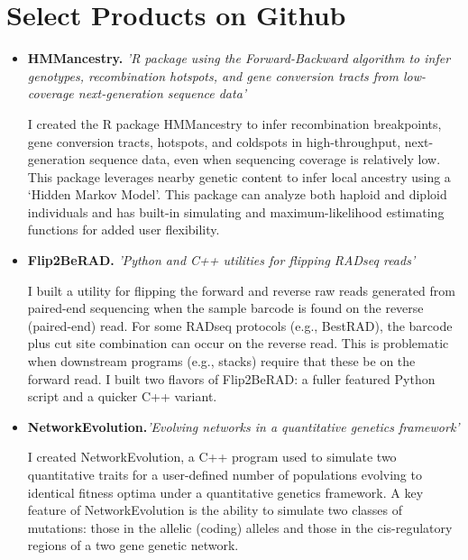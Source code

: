 \documentclass[11pt,letterpaper,sans]{moderncv}        %
\begin{document}
\section{Select Products on Github}


\begin{itemize}

\item{\textbf{HMMancestry.} \textit{'R package using the Forward-Backward algorithm to infer genotypes, recombination hotspots, and gene conversion tracts from low-coverage next-generation sequence data'}


\small{I created the R package HMMancestry to infer recombination breakpoints, gene conversion tracts, hotspots, and coldspots in high-throughput, next-generation sequence data, even when sequencing coverage is relatively low. This package leverages nearby genetic content to infer local ancestry using a `Hidden Markov Model'. This package can analyze both haploid and diploid individuals and has built-in simulating and maximum-likelihood estimating functions for added user flexibility.}}


\item{\textbf{Flip2BeRAD.} \textit{'Python and C++ utilities for flipping RADseq reads'}


\small{I built a utility for flipping the forward and reverse raw reads generated from paired-end sequencing when the sample barcode is found on the reverse (paired-end) read. For some RADseq protocols (e.g., BestRAD), the barcode plus cut site combination can occur on the reverse read. This is problematic when downstream programs (e.g., stacks) require that these be on the forward read. I built two flavors of Flip2BeRAD: a fuller featured Python script and a quicker C++ variant.}}


\item{\textbf{NetworkEvolution.}\textit{'Evolving networks in a quantitative genetics framework'}


\small{I created NetworkEvolution, a C++ program used to simulate two quantitative traits for a user-defined number of populations evolving to identical fitness optima under a quantitative genetics framework. A key feature of NetworkEvolution is the ability to simulate two classes of mutations: those in the allelic (coding) alleles and those in the cis-regulatory regions of a two gene genetic network.}}

\end{itemize}
\end{document}
